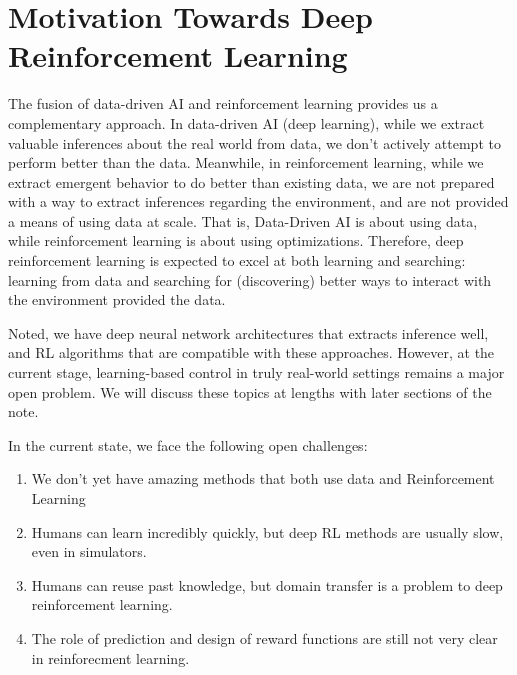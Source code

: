 \section{Motivation Towards Deep Reinforcement Learning}
The fusion of data-driven AI and reinforcement learning provides us a complementary approach.
In data-driven AI (deep learning), while we extract valuable inferences about the real world from data, we don't actively attempt to perform better than the data.
Meanwhile, in reinforcement learning, while we extract emergent behavior to do better than existing data, we are not prepared with a way to extract inferences regarding the environment, and are not provided a means of using data at scale.
That is, Data-Driven AI is about using data, while reinforcement learning is about using optimizations.
Therefore, deep reinforcement learning is expected to excel at both learning and searching: learning from data and searching for (discovering) better ways to interact with the environment provided the data.

Noted, we have deep neural network architectures that extracts inference well, and RL algorithms that are compatible with these approaches.
However, at the current stage, learning-based control in truly real-world settings remains a major open problem.
We will discuss these topics at lengths with later sections of the note.

In the current state, we face the following open challenges:
\begin{enumerate}
    \item We don't yet have amazing methods that both use data and Reinforcement Learning
    \item Humans can learn incredibly quickly, but deep RL methods are usually slow, even in simulators.
    \item Humans can reuse past knowledge, but domain transfer is a problem to deep reinforcement learning.
    \item The role of prediction and design of reward functions are still not very clear in reinforecment learning.
\end{enumerate}
